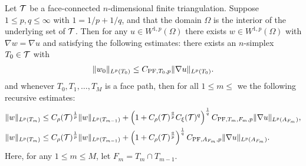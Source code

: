 \documentclass[10pt,a4paper]{article}
\begin{document}
\begin{theorem}\label{theorem:poincarefriedrichsestimate:grad}
    Let ${\mathcal T}$ be a face-connected $n$-dimensional finite triangulation. 
    Suppose $1 \leq p,q \leq \infty$ with $1 = 1/p + 1/q$,
    and that the domain $\Omega$ is the interior of the underlying set of ${\mathcal T}$. 
    Then for any $u \in W^{1,p}(\Omega)$ 
    there exists $w \in W^{1,p}(\Omega)$ with $\nabla w = \nabla u$ 
    and satisfying the following estimates:
    there exists an $n$-simplex $T_0 \in {\mathcal T}$ with 
    \begin{gather*}
        \| w_0 \|_{L^{p}(T_{0})} \leq C_{{{\rm PF}},T_{0},p} \| \nabla u \|_{L^{p}(T_{0})}.
    \end{gather*}
    and whenever $T_0, T_1, \dots, T_M$ is a face path,
    then for all $1 \leq m \leq$ we the following recursive estimates:
    \begin{align*}
        \| w \|_{L^{p}(T_{m})}
        &
        \leq  
        C_\rho({\mathcal T})^{\frac 1 p} 
        \| w \|_{L^{p}(T_{m-1})} 
        + 
        \left( 1 + C_\rho({\mathcal T})^{\frac q p} C_\xi({\mathcal T})^{q} \right)^{\frac 1 q}
        C_{{\rm PF},T_{m},F_{m},p} 
        \| \nabla u \|_{L^{p}(A_{F_m})} 
        ,
        \\
        \| w \|_{L^{p}(T_m)}
        &\leq 
        C_\rho({\mathcal T})^{\frac 1 p} 
        \| w \|_{L^{p}(T_{{m-1}})}
        +
        \left( 1 + C_\rho({\mathcal T})^{\frac q p} \right)^{\frac 1 q}
        C_{{{\rm PF}},A_{F_m},p} 
        \| \nabla u \|_{L^{p}(A_{F_m})} 
        . 
    \end{align*}
    Here, for any $1 \leq m \leq M$, let $F_m = T_m \cap T_{m-1}$.
\end{theorem}
\end{document}
